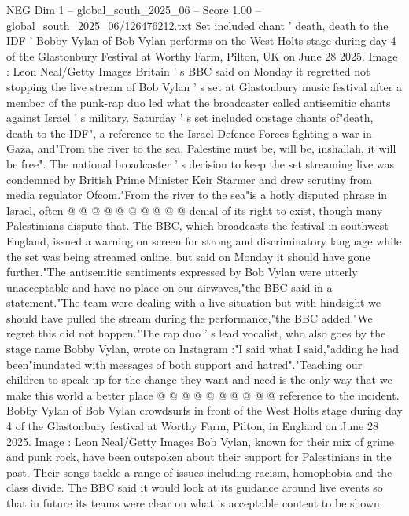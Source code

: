 \begin{textsample}{NEG Dim 1 – global\_south\_2025\_06 – Score 1.00 – global\_south\_2025\_06/126476212.txt}  \label{ex:f1_neg_309}
Set included chant ' death, death to the IDF ' Bobby Vylan of Bob Vylan performs on the West Holts stage during day 4 of the Glastonbury Festival at Worthy Farm, Pilton, UK on June 28 2025.
Image : Leon Neal/Getty Images Britain ' s BBC said on Monday it regretted not stopping the live stream of Bob Vylan ' s set at Glastonbury music festival after a member of the punk-rap duo led what the broadcaster called antisemitic chants against Israel ' s military.
Saturday ' s set included onstage chants of"death, death to the IDF", a reference to the Israel Defence Forces fighting a war in Gaza, and"From the river to the sea, Palestine must be, will be, inshallah, it will be free".
The national broadcaster ' s decision to keep the set streaming live was condemned by British Prime Minister Keir Starmer and drew scrutiny from media regulator Ofcom."From the river to the sea"is a hotly disputed phrase in Israel, often @ @ @ @ @ @ @ @ @ @ denial of its right to exist, though many Palestinians dispute that.
The BBC, which broadcasts the festival in southwest England, issued a warning on screen for strong and discriminatory language while the set was being streamed online, but said on Monday it should have gone further."The antisemitic sentiments expressed by Bob Vylan were utterly unacceptable and have no place on our airwaves,"the BBC said in a statement."The team were dealing with a live situation but with hindsight we should have pulled the stream during the performance,"the BBC added."We regret this did not happen."The rap duo ' s lead vocalist, who also goes by the stage name Bobby Vylan, wrote on Instagram :"I said what I said,"adding he had been"inundated with messages of both support and hatred"."Teaching our children to speak up for the change they want and need is the only way that we make this world a better place @ @ @ @ @ @ @ @ @ @ reference to the incident.
Bobby Vylan of Bob Vylan crowdsurfs in front of the West Holts stage during day 4 of the Glastonbury festival at Worthy Farm, Pilton, in England on June 28 2025.
Image : Leon Neal/Getty Images Bob Vylan, known for their mix of grime and punk rock, have been outspoken about their support for Palestinians in the past.
Their songs tackle a range of issues including racism, homophobia and the class divide.
The BBC said it would look at its guidance around live events so that in future its teams were clear on what is acceptable content to be shown.

\end{textsample}
